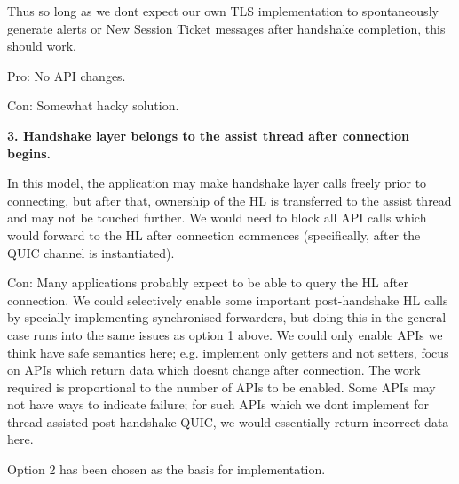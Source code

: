 \begin{DoxyItemize}
Thus so long as we don\textquotesingle{}t expect our own TLS implementation to spontaneously generate alerts or New Session Ticket messages after handshake completion, this should work.

Pro\+: No API changes.

Con\+: Somewhat hacky solution.
\item {\bfseries{3. Handshake layer belongs to the assist thread after connection begins.}}

In this model, the application may make handshake layer calls freely prior to connecting, but after that, ownership of the HL is transferred to the assist thread and may not be touched further. We would need to block all API calls which would forward to the HL after connection commences (specifically, after the QUIC channel is instantiated).

Con\+: Many applications probably expect to be able to query the HL after connection. We could selectively enable some important post-\/handshake HL calls by specially implementing synchronised forwarders, but doing this in the general case runs into the same issues as option 1 above. We could only enable APIs we think have safe semantics here; e.\+g. implement only getters and not setters, focus on APIs which return data which doesn\textquotesingle{}t change after connection. The work required is proportional to the number of APIs to be enabled. Some APIs may not have ways to indicate failure; for such APIs which we don\textquotesingle{}t implement for thread assisted post-\/handshake QUIC, we would essentially return incorrect data here.
\end{DoxyItemize}

Option 2 has been chosen as the basis for implementation. 